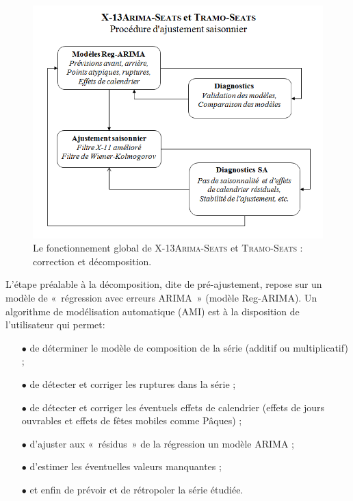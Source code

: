 \documentclass[12pt, a4paper, french]{article}
\begin{document}
\begin{figure}[!ht]
\begin{center}
 \includegraphics[scale=0.8]{img/MethodesX13-TS.png}
 \caption{Le fonctionnement global de \textsc{X-13Arima-Seats} et \textsc{Tramo-Seats} : correction et décomposition.}
 \label{fig:X13TS}
\end{center}
\end{figure}

L'étape préalable à la décomposition, dite de pré-ajustement, repose sur un modèle de «~régression avec erreurs ARIMA~» (modèle Reg-ARIMA). Un algorithme de modélisation automatique (AMI) est à la disposition de l'utilisateur qui permet:
\begin{itemize}
  \item[$\bullet$] de déterminer le modèle de composition de la série (additif ou multiplicatif) ;
	\item[$\bullet$] de détecter et corriger les ruptures dans la série ; 
	\item[$\bullet$] de détecter et corriger les éventuels effets de calendrier (effets de jours ouvrables et effets de fêtes mobiles comme Pâques) ;
	\item[$\bullet$] d'ajuster aux «~résidus~» de la régression un modèle ARIMA ;
	\item[$\bullet$] d'estimer les éventuelles valeurs manquantes ;
	\item[$\bullet$] et enfin de prévoir et de rétropoler la série étudiée.
\end{itemize}
\end{document}
